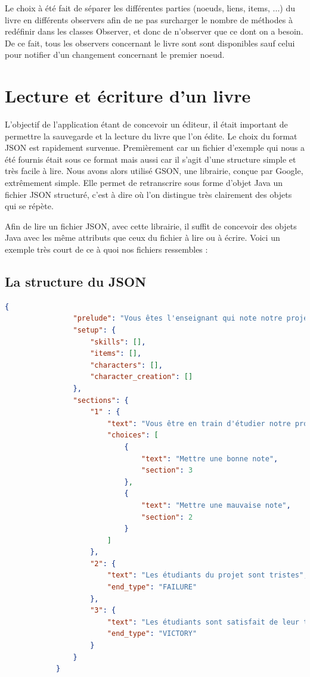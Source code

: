 			Le choix à été fait de séparer les différentes parties (noeuds, liens, items, ...) du livre en différents observers afin de ne pas surcharger le nombre de méthodes à redéfinir dans les classes Observer, et donc de n'observer que ce dont on a besoin. De ce fait, tous les observers concernant le livre sont sont disponibles sauf celui pour notifier d'un changement concernant le premier noeud.

	\section{Lecture et écriture d'un livre}\label{sec:Json}

		L'objectif de l'application étant de concevoir un éditeur, il était important de permettre la sauvegarde et la lecture du livre que l'on édite. Le choix du format JSON est rapidement survenue. Premièrement car un fichier d'exemple qui nous a été fournis était sous ce format mais aussi car il s'agit d'une structure simple et très facile à lire. Nous avons alors utilisé GSON, une librairie, conçue par Google, extrêmement simple. Elle permet de retranscrire sous forme d'objet Java un fichier JSON structuré, c'est à dire où l'on distingue très clairement des objets qui se répète.

		Afin de lire un fichier JSON, avec cette librairie, il suffit de concevoir des objets Java avec les même attributs que ceux du fichier à lire ou à écrire. Voici un exemple très court de ce à quoi nos fichiers ressembles :

		\subsection{La structure du JSON}

			\begin{lstlisting}[gobble=12, language=json, caption=Exemple de livre très simple, label=lst:exemple_livre]
			{
				"prelude": "Vous êtes l'enseignant qui note notre projet",
				"setup": {
					"skills": [],
					"items": [],
					"characters": [],
					"character_creation": []
				},
				"sections": {
					"1" : {
						"text": "Vous être en train d'étudier notre projet",
						"choices": [
							{
								"text": "Mettre une bonne note",
								"section": 3
							},
							{
								"text": "Mettre une mauvaise note",
								"section": 2
							}
						]
					},
					"2": {
						"text": "Les étudiants du projet sont tristes",
						"end_type": "FAILURE"
					},
					"3": {
						"text": "Les étudiants sont satisfait de leur travail",
						"end_type": "VICTORY"
					}
				}
			}
			\end{lstlisting}

